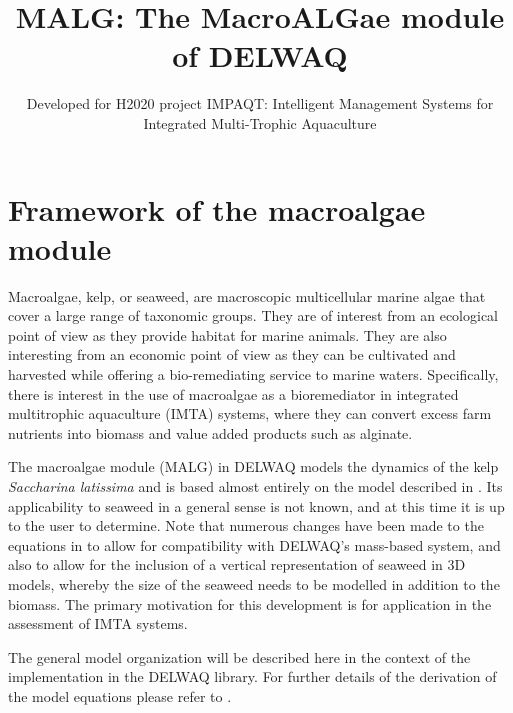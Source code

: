 \documentclass{deltares_manual}
\begin{document}
\title{MALG: The MacroALGae module of DELWAQ}
\subtitle{Developed for H2020 project IMPAQT: Intelligent Management Systems for Integrated Multi-Trophic Aquaculture}
\deltarestitle
	
\chapter{Framework of the macroalgae module}

Macroalgae, kelp, or seaweed, are macroscopic multicellular marine algae that cover a large range of taxonomic groups. They are of interest from an ecological point of view as they provide habitat for marine animals. They are also interesting from an economic point of view as they can be cultivated and harvested while offering a bio-remediating service to marine waters. Specifically, there is interest in the use of macroalgae as a bioremediator in integrated multitrophic aquaculture (IMTA) systems, where they can convert excess farm nutrients into biomass and value added products such as alginate. 

The macroalgae module (MALG) in DELWAQ models the dynamics of the kelp \textit{Saccharina latissima} and is based almost entirely on the model described in \cite{broch2012}. Its applicability to seaweed in a general sense is not known, and at this time it is up to the user to determine. Note that numerous changes have been made to the equations in \cite{broch2012} to allow for compatibility with DELWAQ's mass-based system, and also to allow for the inclusion of a vertical representation of seaweed in 3D models, whereby the size of the seaweed needs to be modelled in addition to the biomass. The primary motivation for this development is for application in the assessment of IMTA systems. 

The general model organization will be described here in the context of the implementation in the DELWAQ library. For further details of the derivation of the model equations please refer to \cite{broch2012}.
\end{document}
